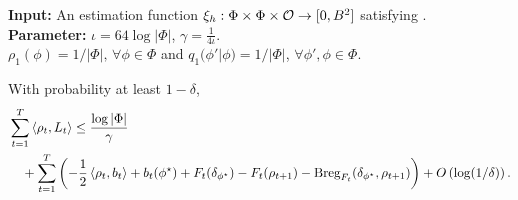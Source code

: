 \begin{algorithm}[H]
    \caption{Bi-level learning algorithm for squared estimation error}
    \label{alg:MF-BiLevel-final}
    \textbf{Input:} An estimation function $\xi_h: \Phi\times\Phi\times \mathcal{O}\to [0, B^2]$ satisfying . \\
    \textbf{Parameter:} $\iota = 64\log|\Phi|$, $\gamma=\frac{1}{4\iota}$. \\
   $\rho_1(\phi) = 1/|\Phi|,\, \forall \phi \in \Phi$ and  $q_1(\phi'|\phi) = 1/|\Phi|$, $\forall \phi', \phi\in \Phi$. \\
\end{algorithm}


\begin{lemma}\label{lem: online esitmation bilinear outer general}
    With probability at least $1-\delta$, 
    \begin{align*}
        &\sum_{t=1}^T \left\langle\rho_{t}, L_t\right\rangle \le \frac{\log|\Phi|}{\gamma} \\
        &\quad +  \sum_{t=1}^T \left(- \frac{1}{2} \left\langle\rho_{t}, b_t\right\rangle + b_t(\phi^\star) +  F_t(\delta_{\phi^\star}) - F_t(\rho_{t+1}) - \textup{Breg}_{F_t}(\delta_{\phi^\star}, \rho_{t+1}) \right) + O\left(\log(1/\delta)\right).  
    \end{align*}
\end{lemma}

